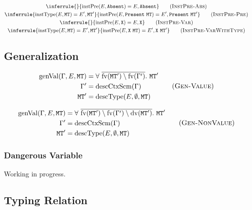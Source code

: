 \documentclass{report}
\newcommand{\code}{\mathtt}
\newcommand{\ruleTag}[1]{\label{#1}\tag{\textsc{#1}}}
\DeclareMathOperator{\describeContextScheme}{descCtxScm}
\DeclareMathOperator{\describeType}{descType}
\DeclareMathOperator{\instantiateType}{instType}
\DeclareMathOperator{\instantiatePresence}{instPre}
\DeclareMathOperator{\generalizeValue}{genVal}
\DeclareMathOperator{\freeVariable}{fv}
\DeclareMathOperator{\dangerousVariable}{dv}
\begin{document}
\begin{gather}
\inferrule
{}
{\instantiatePresence(E, \code{Absent}) = E, \code{Absent}}
\ruleTag{InstPre-Abs}
\\
\inferrule
{\instantiateType(E, \code{MT}) = E', \code{MT}'}
{\instantiatePresence(E, \code{Present}\ \code{MT}) = E', \code{Present}\ \code{MT}'}
\ruleTag{InstPre-Pre}
\\
\inferrule
{}
{\instantiatePresence(E, \code{X}) = E, \code{X}}
\ruleTag{InstPre-Var}
\\
\inferrule
{\instantiateType(E, \code{MT}) = E', \code{MT}'}
{\instantiatePresence(E, \code{X}\ \code{MT}) = E', \code{X}\ \code{MT}'}
\ruleTag{InstPre-VarWithType}
\end{gather}

\subsection{Generalization}

\begin{equation}
\begin{split}
\generalizeValue(\Gamma, E, \code{MT}) & = \forall\ \overline{\freeVariable(\code{MT}') \setminus \freeVariable(\Gamma')}.\ \code{MT}' \\
\Gamma' & = \describeContextScheme(\Gamma) \\
\code{MT}' & = \describeType(E, \emptyset, \code{MT})
\end{split}
\ruleTag{Gen-Value}
\end{equation}

\begin{equation}
\begin{split}
\generalizeValue(\Gamma, E, \code{MT}) & = \forall\ \overline{\freeVariable(\code{MT}') \setminus \freeVariable(\Gamma') \setminus \dangerousVariable(\code{MT}')}.\ \code{MT}' \\
\Gamma' & = \describeContextScheme(\Gamma) \\
\code{MT}' & = \describeType(E, \emptyset, \code{MT})
\end{split}
\ruleTag{Gen-NonValue}
\end{equation}

\subsubsection{Dangerous Variable}

Working in progress.

\subsection{Typing Relation}
\end{document}
